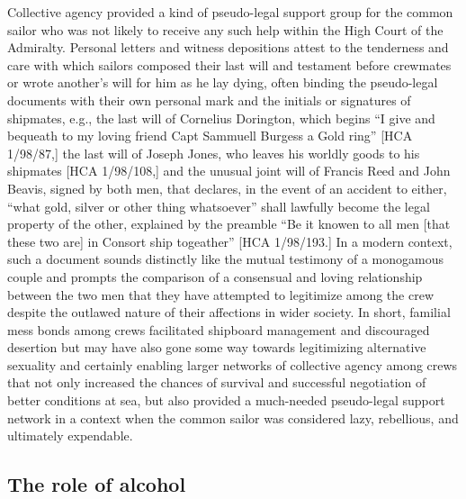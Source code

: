 Collective agency provided a kind of pseudo-legal support group for the common sailor who was not likely to receive any such help within the High Court of the Admiralty. Personal letters and witness depositions attest to the tenderness and care with which sailors composed their last will and testament before crewmates or wrote another’s will for him as he lay dying, often binding the pseudo-legal documents with their own personal mark and the initials or signatures of shipmates, e.g., the last will of Cornelius Dorington, which begins “I give and bequeath to my loving friend Capt Sammuell Burgess a Gold ring” [HCA 1/98/87,] the last will of Joseph Jones, who leaves his worldly goods to his shipmates [HCA 1/98/108,] and the unusual joint will of Francis Reed and John Beavis, signed by both men, that declares, in the event of an accident to either, “what gold, silver or other thing whatsoever” shall lawfully become the legal property of the other, explained by the preamble “Be it knowen to all men [that these two are] in Consort ship togeather” [HCA 1/98/193.] In a modern context, such a document sounds distinctly like the mutual testimony of a monogamous couple and prompts the comparison of a consensual and loving relationship between the two men that they have attempted to legitimize among the crew despite the outlawed nature of their affections in wider society. In short, familial mess bonds among crews facilitated shipboard management and discouraged desertion but may have also gone some way towards legitimizing alternative sexuality and certainly enabling larger networks of collective agency among crews that not only increased the chances of survival and successful negotiation of better conditions at sea, but also provided a much-needed pseudo-legal support network in a context when the common sailor was considered lazy, rebellious, and ultimately expendable. 

\subsection{\textbf{The} \textbf{role} \textbf{of} \textbf{alcohol} }%

